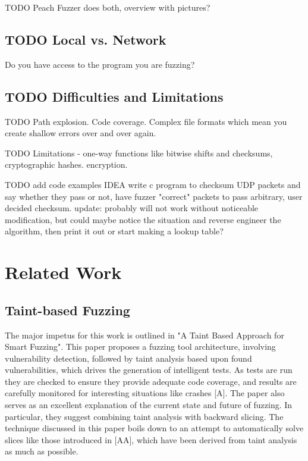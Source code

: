 \documentclass[11pt,expanded,copyright]{fsuthesis}
\begin{document}
TODO Peach Fuzzer does both, overview with pictures?

\section{TODO Local vs. Network}

Do you have access to the program you are fuzzing?

\section{TODO Difficulties and Limitations}

TODO Path explosion. Code coverage. Complex file formats which mean you create shallow errors over and over again.

TODO Limitations - one-way functions like bitwise shifts and checksums, cryptographic hashes. encryption.

TODO add code examples
IDEA write c program to checksum UDP packets and say whether they pass or not, have fuzzer "correct" packets to pass arbitrary, user decided checksum.
update: probably will not work without noticeable modification, but could maybe notice the situation and reverse engineer the algorithm, then print it out or start making a lookup table?

\chapter{Related Work}

\section{Taint-based Fuzzing}

The major impetus for this work is outlined in "A Taint Based Approach for Smart Fuzzing". This paper proposes a fuzzing tool architecture, involving vulnerability detection, followed by taint analysis based upon found vulnerabilities, which drives the generation of intelligent tests. As tests are run they are checked to ensure they provide adequate code coverage, and results are carefully monitored for interesting situations like crashes [A]. The paper also serves as an excellent explanation of the current state and future of fuzzing. In particular, they suggest combining taint analysis with backward slicing. The technique discussed in this paper boils down to an attempt to automatically solve slices like those introduced in [AA], which have been derived from taint analysis as much as possible.
\end{document}

